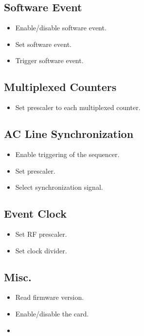 \documentclass[a4paper,10pt]{article}
\begin{document}
	\subsection{Software Event}
	\begin{itemize}
		\item Enable/disable software event.
		\item Set software event.
		\item Trigger software event.
	\end{itemize}

	\subsection{Multiplexed Counters}
	\begin{itemize}
		\item Set prescaler to each multiplexed counter.
	\end{itemize}

	\subsection{AC Line Synchronization}
	\begin{itemize}
		\item Enable triggering of the sequencer.
		\item Set prescaler.
		\item Select synchronization signal.
	\end{itemize}

	\subsection{Event Clock}
	\begin{itemize}
		\item Set RF prescaler.
		\item Set clock divider.
	\end{itemize}

	\subsection{Misc.}
	\begin{itemize}
		\item Read firmware version.
		\item Enable/disable the card.
		\item 
	\end{itemize}
\end{document}
